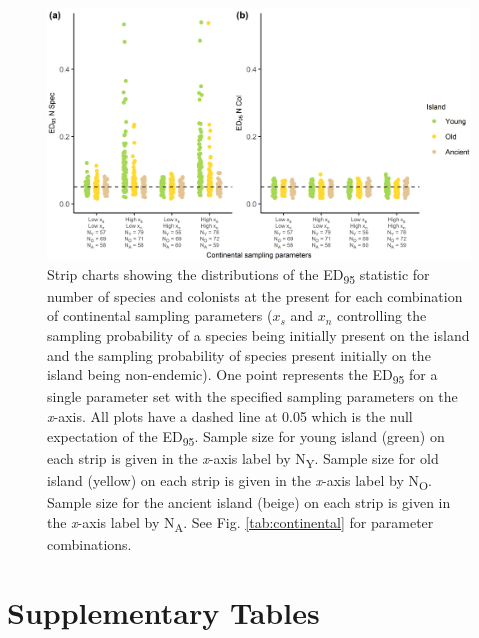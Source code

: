 \begin{figure}
    \centering
    \includegraphics{continental_spec_col_facet_.png}
    \caption{Strip charts showing the distributions of the ED\textsubscript{95} statistic for number of species and colonists at the present for each combination of continental sampling parameters ($x_s$ and $x_n$ controlling the sampling probability of a species being initially present on the island and the sampling probability of species present initially on the island being non-endemic). One point represents the ED\textsubscript{95} for a single parameter set with the specified sampling parameters on the \textit{x}-axis. All plots have a dashed line at 0.05 which is the null expectation of the ED\textsubscript{95}. Sample size for young island (green) on each strip is given in the \textit{x}-axis label by N\textsubscript{Y}. Sample size for old island (yellow) on each strip is given in the \textit{x}-axis label by N\textsubscript{O}. Sample size for the ancient island (beige) on each strip is given in the \textit{x}-axis label by N\textsubscript{A}. See Fig. \ref{tab:continental} for parameter combinations.}
    \label{fig:continental_spec_col_facet_}
\end{figure}

\clearpage

\section*{Supplementary Tables}

